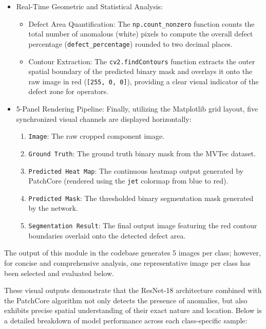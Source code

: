 \documentclass{article}
\begin{document}
\begin{itemize}
	\item Real-Time Geometric and Statistical Analysis:
	\begin{itemize}
		\item Defect Area Quantification: The \texttt{np.count\_nonzero} function counts the total number of anomalous (white) pixels to compute the overall defect percentage (\texttt{defect\_percentage}) rounded to two decimal places.
		\item Contour Extraction: The \texttt{cv2.findContours} function extracts the outer spatial boundary of the predicted binary mask and overlays it onto the raw image in red (\texttt{[255, 0, 0]}), providing a clear visual indicator of the defect zone for operators.
	\end{itemize}
	
	\item 5-Panel Rendering Pipeline:
	Finally, utilizing the Matplotlib grid layout, five synchronized visual channels are displayed horizontally:
	\begin{enumerate}
		\item \texttt{Image}: The raw cropped component image.
		\item \texttt{Ground Truth}: The ground truth binary mask from the MVTec dataset.
		\item \texttt{Predicted Heat Map}: The continuous heatmap output generated by PatchCore (rendered using the \texttt{jet} colormap from blue to red).
		\item \texttt{Predicted Mask}: The thresholded binary segmentation mask generated by the network.
		\item \texttt{Segmentation Result}: The final output image featuring the red contour boundaries overlaid onto the detected defect area.
	\end{enumerate}
\end{itemize}



The output of this module in the codebase generates 5 images per class; however, for concise and comprehensive analysis, one representative image per class has been selected and evaluated below.

These visual outputs demonstrate that the ResNet-18 architecture combined with the PatchCore algorithm not only detects the presence of anomalies, but also exhibits precise spatial understanding of their exact nature and location. Below is a detailed breakdown of model performance across each class-specific sample:
\end{document}
